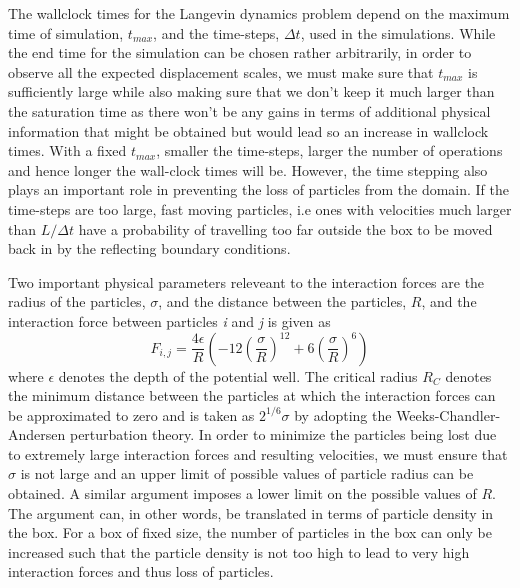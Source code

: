 \documentclass[11pt, oneside]{article}
\begin{document}
The wallclock times for the Langevin dynamics problem depend on the maximum time of simulation, $t_{max}$, and the time-steps, $\Delta t$, used in the simulations. While the end time for the simulation can be chosen rather arbitrarily, in order to observe all the expected displacement scales, we must make sure that $t_{max}$ is sufficiently large while also making sure that we don't keep it much larger than the saturation time as there won't be any gains in terms of additional physical information that might be obtained but would lead so an increase in wallclock times. With a fixed  $t_{max}$, smaller the time-steps, larger the number of operations and hence longer the wall-clock times will be. However, the time stepping also plays an important role in preventing the loss of particles from the domain. If the time-steps are too large, fast moving particles, i.e ones with velocities much larger than $L/\Delta t$ have a probability of travelling too far outside the box to be moved back in by the reflecting boundary conditions.

Two important physical parameters releveant to the interaction forces are the radius of the particles, $\sigma$, and the distance between the particles, $R$, and the interaction force between particles \textit{i} and \textit{j} is given as \[F_{i,j} =  \frac{4 \epsilon}{R} \left ( -12 \left ( \frac{\sigma}{R} \right )^{12} + 6 \left ( \frac{\sigma}{R} \right )^{6} \right)\]
where $\epsilon$ denotes the depth of the potential well. The critical radius $R_C$ denotes the minimum distance between the particles at which the interaction forces can be approximated to zero and is  taken as $2^{1/6} \sigma$ by adopting the Weeks-Chandler-Andersen perturbation theory. In order to minimize the particles being lost due to extremely large interaction forces and resulting velocities, we must ensure that $\sigma$ is not large and an upper limit of possible values of particle radius can be obtained. A similar argument imposes a lower limit on the possible values of $R$. The argument can, in other words, be translated in terms of particle density in the box. For a box of fixed size, the number of particles in the box can only be increased such that the particle density is not too high to lead to very high interaction forces and thus loss of particles.
\end{document}
